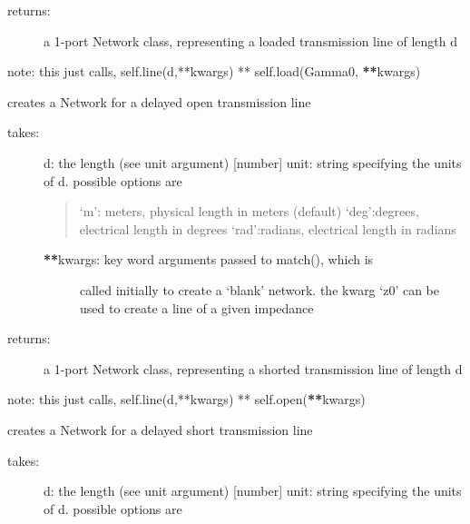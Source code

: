 \documentclass[letterpaper,10pt,english]{sphinxmanual}
\begin{document}
\begin{fulllineitems}
\begin{fulllineitems}
\begin{description}
\begin{description}
\end{description}

\item[{returns:}] \leavevmode
a 1-port Network class, representing a loaded transmission
line of length d

\end{description}

note: this just calls,
self.line(d,**kwargs) ** self.load(Gamma0, {\color{red}\bfseries{}**}kwargs)

\end{fulllineitems}


\begin{fulllineitems}
\label{auto_workingband:mwavepy.WorkingBand.delay_open}
creates a Network for a delayed open transmission line
\begin{description}
\item[{takes:}] \leavevmode
d: the length (see unit argument) {[}number{]}
unit: string specifying the units of d. possible options are
\begin{quote}

`m': meters, physical length in meters (default)
`deg':degrees, electrical length in degrees
`rad':radians, electrical length in radians
\end{quote}
\begin{description}
\item[{{\color{red}\bfseries{}**}kwargs: key word arguments passed to match(), which is }] \leavevmode
called initially to create a `blank' network. the kwarg
`z0' can be used to create a line of a given impedance

\end{description}

\item[{returns:}] \leavevmode
a 1-port Network class, representing a shorted transmission
line of length d

\end{description}

note: this just calls,
self.line(d,**kwargs) ** self.open({\color{red}\bfseries{}**}kwargs)

\end{fulllineitems}


\begin{fulllineitems}
\label{auto_workingband:mwavepy.WorkingBand.delay_short}
creates a Network for a delayed short transmission line
\begin{description}
\item[{takes:}] \leavevmode
d: the length (see unit argument) {[}number{]}
unit: string specifying the units of d. possible options are
\begin{quote}


\end{quote}
\end{description}
\end{fulllineitems}
\end{fulllineitems}
\end{document}
